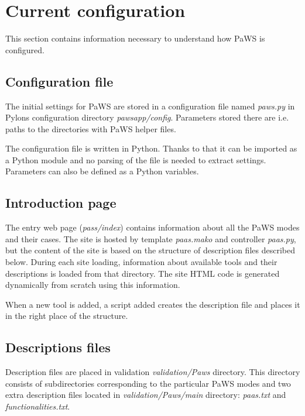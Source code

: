 \section{Current configuration}
\label{currentconfiguration}

This section contains information necessary to understand how PaWS is configured.

\subsection{Configuration file}

The initial settings for PaWS are stored in a configuration file named \emph{paws.py} in Pylons configuration directory \emph{pawsapp/config}. Parameters stored there are i.e. paths to the directories with PaWS helper files.

The configuration file is written in Python. Thanks to that it can be imported as a Python module and no parsing of the file is needed to extract settings. Parameters can also be defined as a Python variables.

\subsection{Introduction page}

The entry web page (\emph{pass/index}) contains information about all the PaWS modes and their cases. The site is hosted by template \emph{paas.mako} and controller \emph{paas.py}, but the content of the site is based on the structure of description files described below. During each site loading, information about available tools and their descriptions is loaded from that directory. The site HTML code is generated dynamically from scratch using this information.

When a new tool is added, a script added creates the description file and places it in the right place of the structure.

\subsection{Descriptions files}

Description files are placed in validation \emph{validation/Paws} directory. This directory consists of subdirectories corresponding to the particular PaWS modes and two extra description files located in \emph{validation/Paws/main} directory: \emph{paas.txt} and \emph{functionalities.txt}. 

